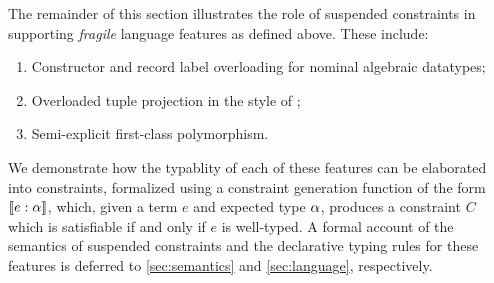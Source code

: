 \documentclass[acmsmall,screen,nonacm]{acmart}
\begin{document}

The remainder of this section illustrates the role of suspended constraints
in supporting \emph{fragile} language features as defined above.
These include:
\begin{enumerate}
  \item Constructor and record label overloading for nominal algebraic
  datatypes;  
  \item Overloaded tuple projection in the style of \SML; 
  \item Semi-explicit first-class polymorphism.
\end{enumerate}
We demonstrate how the typablity of each of these features can be elaborated
into constraints, formalized using a constraint generation function of the
form $\llbracket e : \alpha\rrbracket$, which, given a term $e$ and expected type $\alpha$,
produces a constraint $C$ which is satisfiable if and only if $e$ is
well-typed. A formal account of the semantics of suspended constraints and
the declarative typing rules for these features is deferred to 
\cref{sec:semantics} and \cref{sec:language}, respectively.


\end{document}
